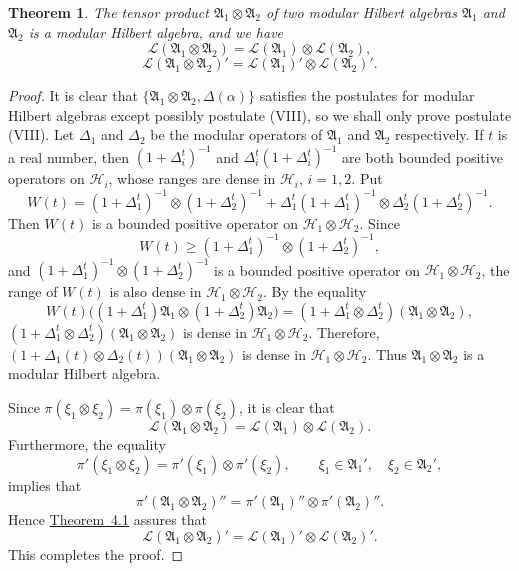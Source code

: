 \documentclass[12pt,b5paper,twoside]{article}
\theoremstyle{takesaki}
\newtheorem{theorem}{Theorem}[section]
\numberwithin{equation}{section}
\begin{document}
\begin{theorem}\label{thm:11.1}
The tensor product $\mathfrak A_1\otimes\mathfrak A_2$ of two modular
Hilbert algebras $\mathfrak A_1$ and $\mathfrak A_2$ is a modular
Hilbert algebra, and we have
\[
 \mathcal L(\mathfrak A_1\otimes\mathfrak A_2)
 =\mathcal L(\mathfrak A_1)\otimes
  \mathcal L(\mathfrak A_2),
\]
\[
 \mathcal L(\mathfrak A_1\otimes\mathfrak A_2)'
 =\mathcal L(\mathfrak A_1)'\otimes
  \mathcal L(\mathfrak A_2)'.
\]
\end{theorem}

\begin{proof}
It is clear that $\{\mathfrak A_1\otimes\mathfrak A_2,\Delta(\alpha)\}$
satisfies the postulates for modular Hilbert algebras except possibly
postulate (VIII), so we shall only prove postulate (VIII).  Let
$\Delta_1$ and $\Delta_2$ be the modular operators of
$\mathfrak A_1$ and $\mathfrak A_2$ respectively.  If $t$ is a real
number, then $(1+\Delta_i^t)^{-1}$ and
$\Delta_i^t(1+\Delta_i^t)^{-1}$ are both bounded positive operators
on $\mathcal H_i$, whose ranges are dense in $\mathcal H_i$,
$i=1,2$.  Put
\[
 W(t)=(1+\Delta_1^t)^{-1}\otimes(1+\Delta_2^t)^{-1}
 +\Delta_1^t(1+\Delta_1^t)^{-1}\otimes
  \Delta_2^t(1+\Delta_2^t)^{-1}.
\]
Then $W(t)$ is a bounded positive operator on
$\mathcal H_1\otimes\mathcal H_2$.  Since
\[
 W(t)\geq(1+\Delta_1^t)^{-1}\otimes(1+\Delta_2^t)^{-1},
\]
and $(1+\Delta_1^t)^{-1}\otimes(1+\Delta_2^t)^{-1}$ is a bounded
positive operator on $\mathcal H_1\otimes\mathcal H_2$, the range of
$W(t)$ is also dense in $\mathcal H_1\otimes\mathcal H_2$.  By the
equality
\[
 W(t)\bigl((1+\Delta_1^t)\mathfrak A_1\otimes
 (1+\Delta_2^t)\mathfrak A_2\bigr)
 =(1+\Delta_1^t\otimes\Delta_2^t)
 (\mathfrak A_1\otimes\mathfrak A_2),
\]
$(1+\Delta_1^t\otimes\Delta_2^t)
(\mathfrak A_1\otimes\mathfrak A_2)$ is dense in
$\mathcal H_1\otimes\mathcal H_2$.  Therefore,
$(1+\Delta_1(t)\otimes\Delta_2(t))
(\mathfrak A_1\otimes\mathfrak A_2)$ is dense in
$\mathcal H_1\otimes\mathcal H_2$.  Thus
$\mathfrak A_1\otimes\mathfrak A_2$ is a modular Hilbert algebra.

Since $\pi(\xi_1\otimes\xi_2)=\pi(\xi_1)\otimes\pi(\xi_2)$, it is
clear that
\[
 \mathcal L(\mathfrak A_1\otimes\mathfrak A_2)
 =\mathcal L(\mathfrak A_1)\otimes
  \mathcal L(\mathfrak A_2).
\]
Furthermore, the equality
\[
 \pi'(\xi_1\otimes\xi_2)
 =\pi'(\xi_1)\otimes\pi'(\xi_2),
 \qquad \xi_1\in\mathfrak A_1',\quad\xi_2\in\mathfrak A_2',
\]
implies that
\[
 \pi'(\mathfrak A_1\otimes\mathfrak A_2)''
 =\pi'(\mathfrak A_1)''\otimes
  \pi'(\mathfrak A_2)''.
\]
Hence \hyperref[thm:4.1]{Theorem~4.1} assures that
\[
 \mathcal L(\mathfrak A_1\otimes\mathfrak A_2)'
 =\mathcal L(\mathfrak A_1)'\otimes
  \mathcal L(\mathfrak A_2)'.
\]
This completes the proof.
\end{proof}
\end{document}
